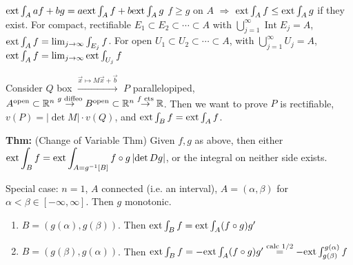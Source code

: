 \documentclass[10pt,letterpaper]{article}
\newcommand{\n}{\hfill\break}
\newcommand{\thm}[1]{\par\noindent\settowidth{\hangindent}{\textbf{Thm: }}\textbf{Thm: }#1\n}
\newcommand{\ptxt}[1]{\textrm{\textnormal{#1}}}
\newcommand{\reals}{\mathbb{R}}
\newcommand{\R}{\reals}
\newcommand{\inv}{^{-1}}
\newcommand{\abs}[1]{\left|#1\right|}
\newcommand{\of}{\circ}
\DeclareMathOperator{\Int}{Int}
\newcommand{\extint}{\ptxt{ext}\int}
\begin{document}
\par\noindent $\extint_{A}af+bg=a\extint_{A}f+b\extint_{A}g$\n
$f\ge{}g$ on $A$ $\Rightarrow$ $\extint_{A}f\le\extint_{A}g$ if they exist.\n
For compact, rectifiable $E_{1}\subset{}E_{2}\subset\cdots\subset{}A$ with $\bigcup_{j=1}^{\infty}\Int{}E_{j}=A$, $\extint_{A}f=\lim_{j\to\infty}\int_{E_{j}}f$.\n
For open $U_{1}\subset{}U_{2}\subset\cdots\subset{}A$, with $\bigcup_{j=1}^{\infty}{U_{j}}=A$, $\extint_{A}f=\lim_{j\to\infty}\extint_{U_{j}}f$\n

\par\noindent Consider $Q$ box $\overset{\vec{x}\mapsto{}M\vec{x}+\vec{b}}{\to}$ $P$ parallelopiped,\n
$A^{\ptxt{open}}\subset\R^{n}\overset{g\ptxt{ diffeo}}{\to}B^{\ptxt{open}}\subset\R^{n}\overset{f\ptxt{ cts}}{\to}\R$.\n
Then we want to prove $P$ is rectifiable, $v(P)=\abs{\det{}M}\cdot{}v(Q)$, and $\extint_{B}f=\extint_{A}f$.\n

\thm{(Change of Variable Thm) Given $f,g$ as above, then either $\displaystyle\extint_{B}f=\extint_{A=g\inv[B]}f\of{}g\abs{\det{}Dg}$, or the integral on neither side exists.}

\par\noindent Special case: $n=1$, $A$ connected (i.e. an interval), $A=(\alpha,\beta)$ for $\alpha<\beta\in[-\infty,\infty]$. Then $g$ monotonic.
\begin{enumerate}[label=Case \arabic*:,leftmargin=1.5cm]
	\item $B=(g(\alpha),g(\beta))$. Then $\extint_{B}f=\extint_{A}(f\of{}g)g'$
	\item $B=(g(\beta),g(\alpha))$. Then $\extint_{B}f=-\extint_{A}(f\of{}g)g'\overset{\ptxt{calc 1/2}}{=}-\extint_{g(\beta)}^{g(\alpha)}f$
\end{enumerate}
\end{document}
